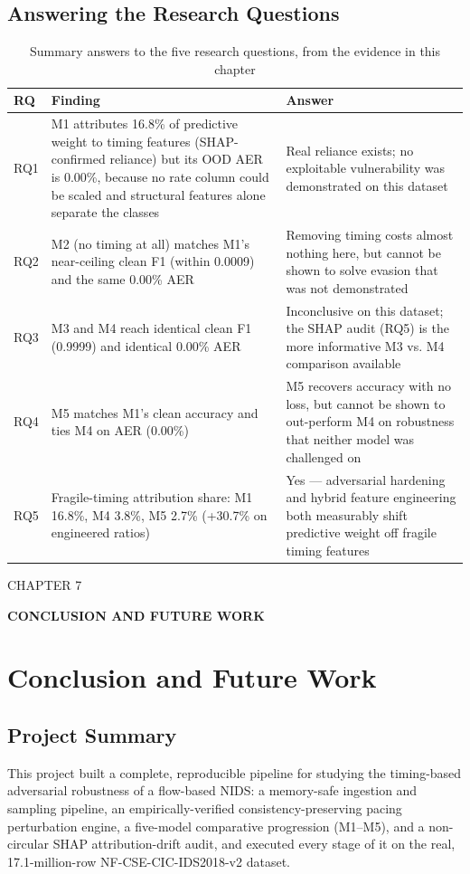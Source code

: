 \documentclass[12pt,a4paper]{report}
\begin{document}
\section{Answering the Research Questions}
\begin{table}[h]\centering
\caption{Summary answers to the five research questions, from the evidence in this chapter}
\begin{tabularx}{\linewidth}{XXX}
\toprule
\textbf{RQ} & \textbf{Finding} & \textbf{Answer} \\
\midrule
RQ1 & M1 attributes 16.8\% of predictive weight to timing features (SHAP-confirmed reliance) but its OOD AER is 0.00\%, because no rate column could be scaled and structural features alone separate the classes & Real reliance exists; no exploitable vulnerability was demonstrated on this dataset \\
RQ2 & M2 (no timing at all) matches M1's near-ceiling clean F1 (within 0.0009) and the same 0.00\% AER & Removing timing costs almost nothing here, but cannot be shown to solve evasion that was not demonstrated \\
RQ3 & M3 and M4 reach identical clean F1 (0.9999) and identical 0.00\% AER & Inconclusive on this dataset; the SHAP audit (RQ5) is the more informative M3 vs. M4 comparison available \\
RQ4 & M5 matches M1's clean accuracy and ties M4 on AER (0.00\%) & M5 recovers accuracy with no loss, but cannot be shown to out-perform M4 on robustness that neither model was challenged on \\
RQ5 & Fragile-timing attribution share: M1 16.8\%, M4 3.8\%, M5 2.7\% (+30.7\% on engineered ratios) & Yes --- adversarial hardening and hybrid feature engineering both measurably shift predictive weight off fragile timing features \\
\bottomrule
\end{tabularx}
\end{table}
\begin{center}CHAPTER 7\end{center}
\begin{center}\textbf{CONCLUSION AND FUTURE WORK}\end{center}\vspace{4pt}
\chapter{Conclusion and Future Work}
\section{Project Summary}
This project built a complete, reproducible pipeline for studying the timing-based adversarial robustness of a flow-based NIDS: a memory-safe ingestion and sampling pipeline, an empirically-verified consistency-preserving pacing perturbation engine, a five-model comparative progression (M1--M5), and a non-circular SHAP attribution-drift audit, and executed every stage of it on the real, 17.1-million-row NF-CSE-CIC-IDS2018-v2 dataset.
\end{document}
